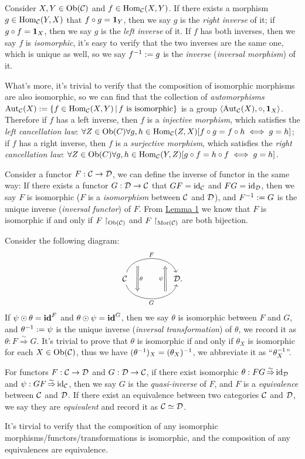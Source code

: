 \documentclass{article}
\begin{document}
\begin{defi}\label{inverse}
	Consider $X,Y\in\mathrm{Ob}(\mathcal{C})$ and $f\in\mathrm{Hom}_{\mathcal{C}}(X,Y)$. If there exists a morphism $g\in\mathrm{Hom}_{\mathcal{C}}(Y,X)$ that $f\circ g=\mathbf{1}_Y$, then we say $g$ is the \emph{right inverse} of it; if $g\circ f=\mathbf{1}_X$, then we say $g$ is the \emph{left inverse} of it. If $f$ has both inverses, then we say $f$ is \emph{isomorphic}, it's easy to verify that the two inverses  are the same one, which is unique as well, so we say $f^{-1}:=g$ is the \emph{inverse} (\emph{inversal morphism}) of it.
	
	What's more, it's trivial to verify that the composition of isomorphic morphisms are also isomorphic, so we can find that the collection of \emph{automorphisms} $\mathrm{Aut}_\C(X):=\{f\in\Hom_\C(X,Y)\,|\,f\ \text{is isomorphic}\}$ is a group $\left<\mathrm{Aut}_{\mathcal{C}}(X),\circ,\mathbf{1}_X\right>$. Therefore if $f$ has a left inverse, then $f$ is a \emph{injective morphism}, which satisfies the \emph{left cancellation law}: $\forall Z\in\mathrm{Ob}(C)\forall g,h\in\mathrm{Hom}_{\mathcal{C}}(Z,X)[f\circ g=f\circ h\iff g=h]$; if $f$ has a right inverse, then $f$ is a \emph{surjective morphism}, which satisfies the \emph{right cancellation law}: $\forall Z\in\mathrm{Ob}(C)\forall g,h\in\mathrm{Hom}_{\mathcal{C}}(Y,Z)[g\circ f=h\circ f\iff g=h]$.
	
	Consider a functor $F:\mathcal{C}\to\mathcal{D}$, we can define the inverse of functor in the same way: If there exists a functor $G:\mathcal{D}\to\mathcal{C}$ that $GF=\mathrm{id}_{\mathcal{C}}$ and $FG=\mathrm{id}_{\mathcal{D}}$, then we say $F$ is isomorphic ($F$ is a \emph{isomorphism} between $\mathcal{C}$ and $\mathcal{D}$), and $F^{-1}:=G$ is the unique inverse (\emph{inversal functor}) of $F$. From \hyperref[map]{Lemma 1} we know that $F$ is isomorphic if and only if  $F\upharpoonright_{\mathrm{Ob}(\mathcal{C})}$ and $F\upharpoonright_{\mathrm{Mor}(\mathcal{C})}$ are both bijection.
	
	Consider the following diagram:
	\[\begin{tikzcd}
		\C 
		\arrow[rr, bend left =75, "F", ""' {name=U1, near start}, ""' {name=U2, near end}]
		\arrow[rr, bend right=75, "G"', "" {name=D1, near start}, ""  {name=D2, near end}]
		&&\D.
		\arrow[Rightarrow, "\theta", from=U1, to=D1]
		\arrow[Rightarrow, "\psi"  , from=D2, to=U2]
    \end{tikzcd}\]
	If $\psi\odot\theta=\mathbf{id}^F$ and $\theta\odot\psi=\mathbf{id}^G$, then we say $\theta$ is isomorphic between $F$ and $G$, and $\theta^{-1}:=\psi$ is the unique inverse (\emph{inversal transformation}) of $\theta$, we record it as $\theta:F\mathop{\Rightarrow}\limits^{\sim}G$. It's trivial to prove that $\theta$ is isomorphic if and only if $\theta_X$ is isomorphic for each $X\in\mathrm{Ob}(\mathcal{C})$, thus we have $(\theta^{-1})_X=(\theta_X)^{-1}$, we abbreviate it as ``$\theta^{-1}_X$''.
	
	For functors $F:\mathcal{C}\to\mathcal{D}$ and $G:\mathcal{D}\to\mathcal{C}$, if there exist isomorphic $\theta:FG\mathop{\Rightarrow}\limits^{\sim}\mathrm{id}_{\mathcal{D}}$ and $\psi:GF\mathop{\Rightarrow}\limits^{\sim}\mathrm{id}_{\mathcal{C}}$, then we say $G$ is the \emph{quasi-inverse} of $F$, and $F$ is a \emph{equivalence} between $\mathcal{C}$ and $\mathcal{D}$. If there exist an equivalence between two categories $\mathcal{C}$ and $\mathcal{D}$, we say they are \emph{equivalent} and record it as $\mathcal{C}\simeq\mathcal{D}$.
	
	It's tirvial to verify that the composition of any isomorphic morphisms/functors/transformations is isomorphic, and the composition of any equivalences are equivalence.
\end{defi}
\end{document}
